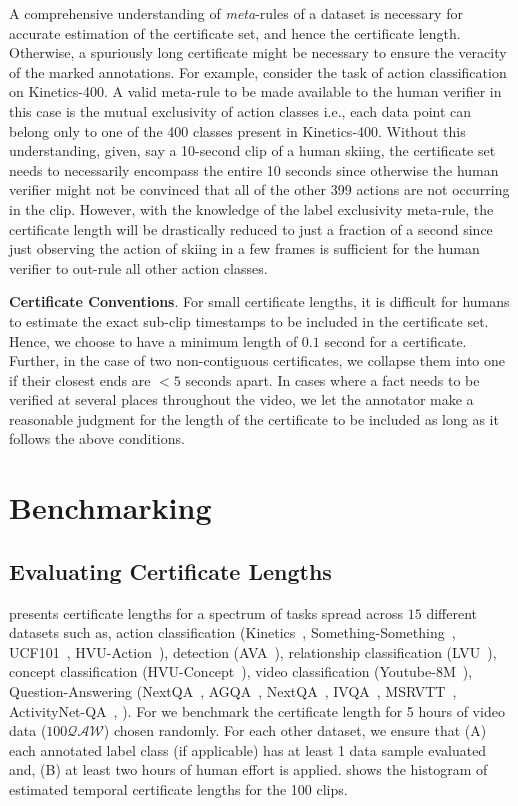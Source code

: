 A comprehensive understanding of \textit{meta}-rules of a dataset is necessary for accurate estimation of the certificate set, and hence the certificate length. Otherwise, a spuriously long certificate might be necessary to ensure the veracity of the marked annotations. For example, consider the task of action classification on Kinetics-400. A valid meta-rule to be made available to the human verifier in this case is the mutual exclusivity of action classes i.e., each data point can belong only to one of the 400 classes present in Kinetics-400. Without this understanding, given, say a 10-second clip of a human skiing, the certificate set needs to necessarily encompass the entire 10 seconds since otherwise the human verifier might not be convinced that all of the other 399 actions are not occurring in the clip. However, with the knowledge of the label exclusivity meta-rule, the certificate length will be drastically reduced to just a fraction of a second since just observing the action of skiing in a few frames is sufficient for the human verifier to out-rule all other action classes. 

\noindent \textbf{Certificate Conventions}. For small certificate lengths, it is difficult for humans to estimate the exact sub-clip timestamps to be included in the certificate set. Hence, we choose to have a minimum length of $0.1$ second for a certificate. Further, in the case of two non-contiguous certificates, we collapse them into one if their closest ends are $<5$ seconds apart. In cases where a fact needs to be verified at several places throughout the video, we let the annotator make a reasonable judgment for the length of the certificate to be included as long as it follows the above conditions. 

\section{Benchmarking\name{}{}}
\subsection{Evaluating Certificate Lengths}
\label{sec:eval_certificate}

 presents certificate lengths for a spectrum of tasks spread across $15$ different datasets such as, action classification (Kinetics~\cite{kinetics400}, Something-Something~\cite{something_something}, UCF101~\cite{ucf101}, HVU-Action~\cite{hvu}), detection (AVA~\cite{ava}), relationship classification (LVU~\cite{lvu}), concept classification (HVU-Concept~\cite{hvu}), video classification (Youtube-8M~\cite{youtube8m}), Question-Answering (NextQA~\cite{nextqa}, AGQA~\cite{agqa2}, NextQA~\cite{nextqa}, IVQA~\cite{ivqa}, MSRVTT~\cite{msrvtt}, ActivityNet-QA~\cite{activitynetqa}, \name{}{}). For\name{}{} we benchmark the certificate length for 5 hours of video data ($100 \mathcal{QAW}$) chosen randomly. For each other dataset, we ensure that (A) each annotated label class (if applicable) has at least 1 data sample evaluated and, (B) at least two hours of human effort is applied.   shows the histogram of estimated \name{}{} temporal certificate lengths for the 100 clips. 


